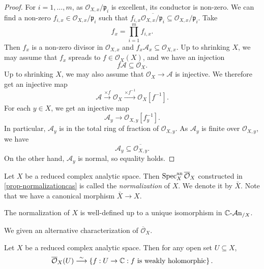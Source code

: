 \begin{proof}
    For $i=1,\ldots,m$, as $\mathcal{O}_{X,x}/\mathfrak{p}_i$ is excellent, its conductor is non-zero. We can find a non-zero $f_{i,x}\in \mathcal{O}_{X,x}/\mathfrak{p}_i$ such that $f_{i,x}\overline{\mathcal{O}_{X,x}/\mathfrak{p}_i}\subseteq \mathcal{O}_{X,x}/\mathfrak{p}_i$. Take 
    \[
        f_x=\prod_{i=1}^m f_{i,x}.  
    \]
    Then $f_x$ is a non-zero divisor in $\mathcal{O}_{X,x}$ and $f_x \mathcal{A}_x\subseteq \mathcal{O}_{X,x}$. Up to shrinking $X$, we may assume that $f_x$ spreads to $f\in \mathcal{O}_X(X)$, and we have an injection
    \[
        f\mathcal{A}\subseteq \mathcal{O}_X.  
    \]
    Up to shrinking $X$, we may also assume that $\mathcal{O}_X\rightarrow \mathcal{A}$ is injective. We therefore get an injective map
    \[
        \mathcal{A}\xrightarrow{\times f} \mathcal{O}_X  \xrightarrow{\times f^{-1}}\mathcal{O}_X[f^{-1}]. 
    \]
    For each $y\in X$, we get an injective map
    \[
        \mathcal{A}_y\rightarrow \mathcal{O}_{X,y}[f_y^{-1}].  
    \]
    In particular, $\mathcal{A}_y$ is in the total ring of fraction of $\mathcal{O}_{X,y}$. As $\mathcal{A}_y$ is finite over $\mathcal{O}_{X,y}$, we have
    \[
        \mathcal{A}_y\subseteq \overline{\mathcal{O}_{X,y}}.
    \]
    On the other hand, $\mathcal{A}_y$ is normal, so equality holds. 
\end{proof}

\begin{definition}
    Let $X$ be a reduced complex analytic space. Then $\operatorname{Spec}^{\mathrm{an}}_X \overline{\mathcal{O}}_X$ constructed in \cref{prop-normalizationcas} is called the \emph{normalization} of $X$. We denote it by $\bar{X}$.
    Note that we have a canonical morphism $\bar{X}\rightarrow X$. 
    
    The normalization of $X$ is well-defined up to a unique isomorphism in $\mathbb{C}\text{-}\mathcal{A}\mathrm{n}_{/X}$.
\end{definition}

We given an alternative characterization of $\overline{\mathcal{O}}_X$.
\begin{proposition}
    Let $X$ be a reduced complex analytic space. Then for any open set $U\subseteq X$, 
    \[
        \overline{\mathcal{O}}_X(U)\stackrel{\sim}{\longrightarrow} \left\{f:U\rightarrow \mathbb{C}: f\text{ is weakly holomorphic} \right\}.      
    \]
\end{proposition}

